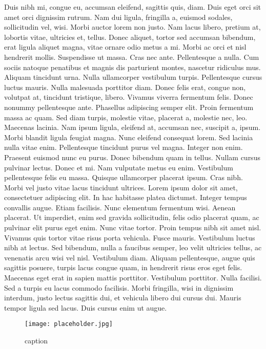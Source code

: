 Duis nibh mi,
congue eu, accumsan eleifend, sagittis quis, diam. Duis eget orci sit amet orci
dignissim rutrum.  Nam dui ligula, fringilla a, euismod sodales, sollicitudin
vel, wisi. Morbi auctor lorem non justo. Nam lacus libero, pretium at, lobortis
vitae, ultricies et, tellus. Donec aliquet, tortor sed accumsan bibendum, erat
ligula aliquet magna, vitae ornare odio metus a mi. Morbi ac orci et nisl
hendrerit mollis. Suspendisse ut massa. Cras nec ante. Pellentesque a nulla. Cum
sociis natoque penatibus et magnis dis parturient montes, nascetur ridiculus
mus. Aliquam tincidunt urna. Nulla ullamcorper vestibulum turpis. Pellentesque
cursus luctus mauris.  Nulla malesuada porttitor diam. Donec felis erat, congue
non, volutpat at, tincidunt tristique, libero. Vivamus viverra fermentum felis.
Donec nonummy pellentesque ante. Phasellus adipiscing semper elit. Proin
fermentum massa ac quam. Sed diam turpis, molestie vitae, placerat a, molestie
nec, leo. Maecenas lacinia. Nam ipsum ligula, eleifend at, accumsan nec,
suscipit a, ipsum. Morbi blandit ligula feugiat magna. Nunc eleifend consequat
lorem. Sed lacinia nulla vitae enim. Pellentesque tincidunt purus vel magna.
Integer non enim. Praesent euismod nunc eu purus. Donec bibendum quam in tellus.
Nullam cursus pulvinar lectus. Donec et mi. Nam vulputate metus eu enim.
Vestibulum pellentesque felis eu massa.  Quisque ullamcorper placerat ipsum.
Cras nibh. Morbi vel justo vitae lacus tincidunt ultrices. Lorem ipsum dolor sit
amet, consectetuer adipiscing elit. In hac habitasse platea dictumst. Integer
tempus convallis augue.  Etiam facilisis. Nunc elementum fermentum wisi. Aenean
placerat. Ut imperdiet, enim sed gravida sollicitudin, felis odio placerat quam,
ac pulvinar elit purus eget enim. Nunc vitae tortor. Proin tempus nibh sit amet
nisl.  Vivamus quis tortor vitae risus porta vehicula.  Fusce mauris. Vestibulum
luctus nibh at lectus. Sed bibendum, nulla a faucibus semper, leo velit
ultricies tellus, ac venenatis arcu wisi vel nisl. Vestibulum diam. Aliquam
pellentesque, augue quis sagittis posuere, turpis lacus congue quam, in
hendrerit risus eros eget felis. Maecenas eget erat in sapien mattis porttitor.
Vestibulum porttitor. Nulla facilisi. Sed a turpis eu lacus commodo facilisis.
Morbi fringilla, wisi in dignissim interdum, justo lectus sagittis dui, et
vehicula libero dui cursus dui. Mauris tempor ligula sed lacus. Duis cursus enim
ut augue.

\begin{wrapfigure}[12]{R}[0pt]{0.25\textwidth}
	\centering
	\texttt{[image: placeholder.jpg]}
	\caption*{
		\label{fig:placeholder_jpg}caption
		\footnotemark
	}
\end{wrapfigure}

